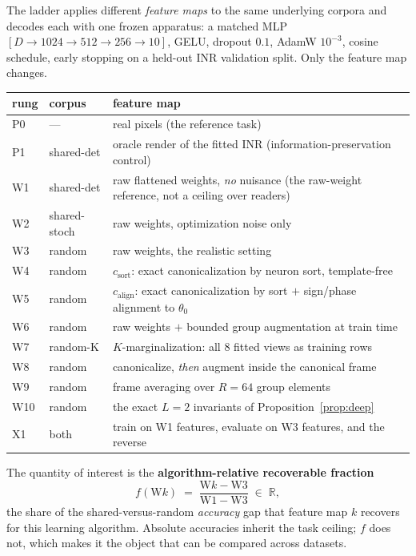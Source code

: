 \documentclass[10pt,twocolumn,letterpaper]{article}
\theoremstyle{definition}
\newcommand{\R}{\mathbb{R}}
\newcommand{\csort}{c_{\mathrm{sort}}}
\newcommand{\calign}{c_{\mathrm{align}}}
\begin{document}
The ladder applies different \emph{feature maps} to the same underlying corpora and decodes each
with one frozen apparatus: a matched MLP $[D \to 1024 \to 512 \to 256 \to 10]$, GELU, dropout
$0.1$, AdamW $10^{-3}$, cosine schedule, early stopping on a held-out INR validation split. Only
the feature map changes.

\begin{center}\small
\footnotesize\begin{tabular}{@{}llp{4.6cm}@{}}
\toprule
rung & corpus & feature map \\
\midrule
P0 & --- & real pixels (the reference task) \\
P1 & shared-det & oracle render of the fitted INR (information-preservation control) \\
W1 & shared-det & raw flattened weights, \emph{no} nuisance (the raw-weight reference, not a ceiling over readers) \\
W2 & shared-stoch & raw weights, optimization noise only \\
W3 & random & raw weights, the realistic setting \\
W4 & random & $\csort$: exact canonicalization by neuron sort, template-free \\
W5 & random & $\calign$: exact canonicalization by sort $+$ sign/phase alignment to $\theta_0$ \\
W6 & random & raw weights $+$ bounded group augmentation at train time \\
W7 & random-K & $K$-marginalization: all 8 fitted views as training rows \\
W8 & random & canonicalize, \emph{then} augment inside the canonical frame \\
W9 & random & frame averaging over $R=64$ group elements \\
W10 & random & the exact $L{=}2$ invariants of Proposition~\ref{prop:deep} \\
X1 & both & train on W1 features, evaluate on W3 features, and the reverse \\
\bottomrule
\end{tabular}
\end{center}

The quantity of interest is the \textbf{algorithm-relative recoverable fraction}
\begin{equation}
f(\mathrm{W}k) \;=\; \frac{\mathrm{W}k - \mathrm{W3}}{\mathrm{W1} - \mathrm{W3}} \;\in\; \R,
\label{eq:f}
\end{equation}
the share of the shared-versus-random \emph{accuracy} gap that feature map $k$ recovers for this
learning algorithm. Absolute accuracies inherit the task ceiling; $f$ does not, which makes it the
object that can be compared across datasets.
\end{document}
